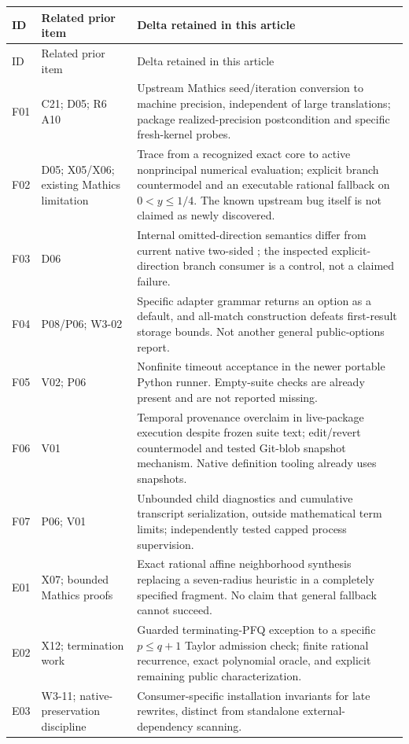 \documentclass[11pt,letterpaper]{article}
\newcommand{\code}[1]{\texttt{\detokenize{#1}}}
\begin{document}
\begin{longtable}{@{}P{.47in}P{1.57in}P{4.24in}@{}}
\toprule
ID & Related prior item & Delta retained in this article\\\midrule\endfirsthead
\toprule ID & Related prior item & Delta retained in this article\\\midrule\endhead
F01 & C21; D05; R6 A10 & Upstream Mathics seed/iteration conversion to machine precision, independent of large translations; package realized-precision postcondition and specific fresh-kernel probes.\\[5pt]
F02 & D05; X05/X06; existing Mathics limitation & Trace from a recognized exact core to active nonprincipal numerical evaluation; explicit branch countermodel and an executable rational fallback on $0<y\le1/4$. The known upstream bug itself is not claimed as newly discovered.\\[5pt]
F03 & D06 & Internal omitted-direction semantics differ from current native two-sided \code{Limit}; the inspected explicit-direction branch consumer is a control, not a claimed failure.\\[5pt]
F04 & P08/P06; W3-02 & Specific \code{FirstPosition} adapter grammar returns an option as a default, and all-match construction defeats first-result storage bounds. Not another general public-options report.\\[5pt]
F05 & V02; P06 & Nonfinite timeout acceptance in the newer portable Python runner. Empty-suite checks are already present and are not reported missing.\\[5pt]
F06 & V01 & Temporal provenance overclaim in live-package execution despite frozen suite text; edit/revert countermodel and tested Git-blob snapshot mechanism. Native definition tooling already uses snapshots.\\[5pt]
F07 & P06; V01 & Unbounded child diagnostics and cumulative transcript serialization, outside mathematical term limits; independently tested capped process supervision.\\[5pt]
E01 & X07; bounded Mathics proofs & Exact rational affine neighborhood synthesis replacing a seven-radius heuristic in a completely specified fragment. No claim that general fallback cannot succeed.\\[5pt]
E02 & X12; termination work & Guarded terminating-PFQ exception to a specific $p\le q+1$ Taylor admission check; finite rational recurrence, exact polynomial oracle, and explicit remaining public characterization.\\[5pt]
E03 & W3-11; native-preservation discipline & Consumer-specific installation invariants for late \code{DownValues} rewrites, distinct from standalone external-dependency scanning.\\
\bottomrule
\end{longtable}
\end{document}
